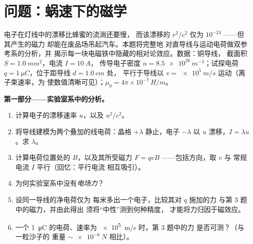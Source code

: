 \section{问题：蜗速下的磁学}

\begin{problem}\label{pb:b3:covariant-electromagnetism:1}
电子在灯线中的漂移比蜂蜜的流淌还要慢，
而该漂移的 $v^2/c^2$ 仅为 $10^{-24}$ ——但其产生的磁力
却能在废品场吊起汽车。本题将完整地
对直导线与运动电荷做双参考系的分析，并
揭示每一块电磁铁中隐藏的相对论效应。数据：铜导线，
截面积 $S = \qty{1.0}{mm^2}$，电流 $I = \qty{10}{A}$，
传导电子密度 $n = \qty{8.5e28}{m^{-3}}$；试探电荷
$q = \qty{1}{\micro C}$，位于距导线 $d = \qty{1.0}{cm}$ 处，
平行于导线以 $v = \qty{e5}{m/s}$ 运动（离子束速率，为
使数值清晰可见）；$\mu_0 = 4\pi\times10^{-7}\,\unit{H/m}$。

\medskip\noindent\textbf{第一部分——实验室系中的分析。}
\begin{enumerate}
  \item 计算电子的漂移速率 $u$，以及 $u^2/c^2$。
  \item 将导线建模为两个叠加的线电荷：晶格
        $+\lambda$ 静止，电子 $-\lambda$ 以
        $u$ 漂移，$I = \lambda u$。求 $\lambda$。
  \item 计算电荷位置处的 $B$，以及其所受磁力
        $F = qvB$ ——包括方向，取 $v$ 与
        常规电流 $I$ 平行（回忆：平行电流
        相互吸引）。
  \item 为何实验室系中没有\emph{电场力}？
  \item 设同一导线的净电荷仅为
        每米多出一个电子，比较其对 $q$ 施加的力
        与第 3 题中的磁力，并由此得出
        须将“中性”测到何种精度，
        才能将力归因于磁效应。
  \item 一个 \qty{1}{\micro C} 的电荷、速率为 \qty{e5}{m/s} 时，第 3 题中的力
        是否可测？（与一粒沙子的
        重量 $\sim\qty{e-6}{N}$ 相比）。
\end{enumerate}


\end{problem}
